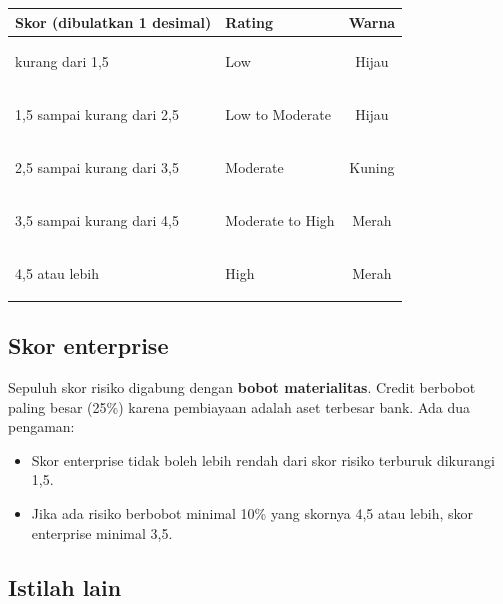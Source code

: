 \documentclass[11pt,a4paper]{article}
\newcommand{\tagG}{\colorbox{tintgreen}{\strut Hijau}}
\newcommand{\tagA}{\colorbox{tintamber}{\strut Kuning}}
\newcommand{\tagR}{\colorbox{tintred}{\strut Merah}}
\begin{document}
\begin{center}
\begin{tabular}{llc}
\toprule
\textbf{Skor (dibulatkan 1 desimal)} & \textbf{Rating} & \textbf{Warna} \\
\midrule
kurang dari 1,5 & Low & \tagG \\
1,5 sampai kurang dari 2,5 & Low to Moderate & \tagG \\
2,5 sampai kurang dari 3,5 & Moderate & \tagA \\
3,5 sampai kurang dari 4,5 & Moderate to High & \tagR \\
4,5 atau lebih & High & \tagR \\
\bottomrule
\end{tabular}
\end{center}

\subsection{Skor enterprise}

Sepuluh skor risiko digabung dengan \textbf{bobot materialitas}. Credit berbobot paling besar (25\%) karena pembiayaan adalah aset terbesar bank. Ada dua pengaman:
\begin{itemize}
\item Skor enterprise tidak boleh lebih rendah dari skor risiko terburuk dikurangi 1,5.
\item Jika ada risiko berbobot minimal 10\% yang skornya 4,5 atau lebih, skor enterprise minimal 3,5.
\end{itemize}

\subsection{Istilah lain}
\end{document}
